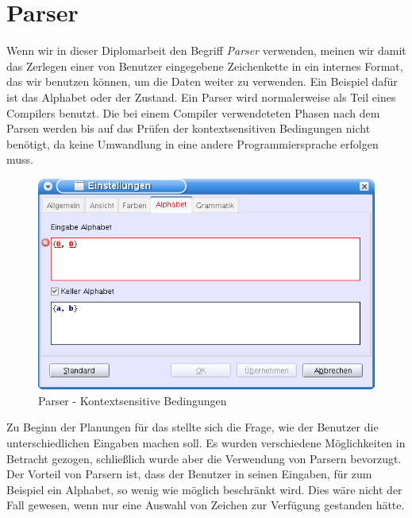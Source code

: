 \section{Parser}\label{Parser}

Wenn wir in dieser Diplomarbeit den Begriff \textit{Parser} verwenden, meinen wir
damit das Zerlegen einer von Benutzer eingegebene Zeichenkette in ein internes
Format, das wir benutzen können, um die Daten weiter zu verwenden. Ein Beispiel
dafür ist das Alphabet oder der Zustand. Ein Parser wird normalerweise als Teil
eines Compilers benutzt. Die bei einem Compiler verwendeteten Phasen nach dem
Parsen werden bis auf das Prüfen der kontextsensitiven Bedingungen nicht
benötigt, da keine Umwandlung in eine andere Programmiersprache erfolgen
muss.\vspace{10pt}

\begin{figure}[h!]
\begin{center}
\includegraphics[width=12cm]{../images/parser.png}
\caption{Parser - Kontextsensitive Bedingungen}
\label{FigureParser}
\end{center}
\end{figure}
\vspace{10pt}

Zu Beginn der Planungen für das \gtitool stellte sich die Frage, wie der Benutzer
die unterschiedlichen Eingaben machen soll. Es wurden verschiedene
Möglichkeiten in Betracht gezogen, schließlich wurde aber die Verwendung von
Parsern bevorzugt. Der Vorteil von Parsern ist, dass der Benutzer in seinen
Eingaben, für zum Beispiel ein Alphabet, so wenig wie möglich beschränkt wird.
Dies wäre nicht der Fall gewesen, wenn nur eine Auswahl von Zeichen zur
Verfügung gestanden hätte.\vspace{10pt}

